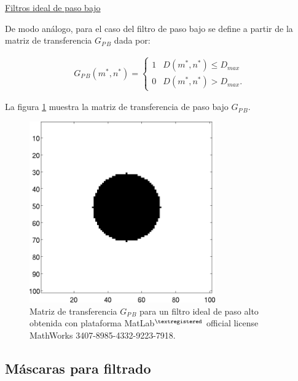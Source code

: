 \begin{center}
\underline{Filtros ideal de paso bajo}
\end{center}

De modo an\'alogo, para el caso del filtro de paso bajo se define a partir de la matriz de transferencia $G_{P\,B}$ dada por:

\begin{eqnarray}
	G_{P\,B}(m^*, n^*) = \left\{ \begin{array}{ll} 
	1 & \mbox{$D(m^*, n^*) \leq D_{max}$}\\
	0 & \mbox{$D(m^*, n^*) > D_{max}$}.\end{array} \right.
\label{EqLXVIII}
\end{eqnarray}

La figura \ref{Fig2_9} muestra la matriz de transferencia de paso bajo $G_{P\,B}$.

\begin{center}
\begin{figure} [!h]

\centering
\includegraphics[width=8cm]{Figuras/Fig2_9.png}
   
\caption{Matriz de transferencia $G_{P\,B}$ para un filtro ideal de paso alto 
         obtenida con plataforma MatLab$^{\textregistered}$ official license MathWorks 3407-8985-4332-9223-7918.}
\label{Fig2_9}

\end{figure}
\end{center}

\subsection{M\'ascaras para filtrado}

